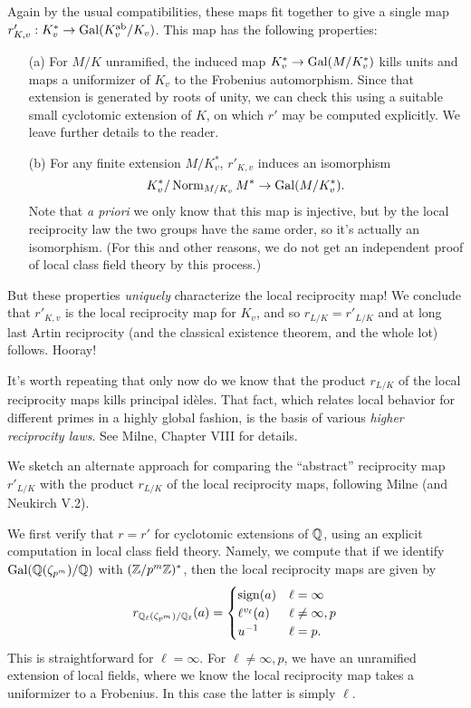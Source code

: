 Again by the usual compatibilities,
these maps fit together to give a single map
$r'_{K,v}: K_v^* \to \operatorname{Gal}(K_v^{\operatorname{ab}}/K_v)$. This map has the following
properties:
\begin{enumerate}
\item[(a)]
For $M/K$ unramified,
the induced map $K_v^* \to \operatorname{Gal}(M/K_v^*)$ kills units
and maps a uniformizer of $K_v$ to the Frobenius automorphism. Since that
extension is generated by roots of unity, we can check this using a 
suitable small cyclotomic extension of $K$, on which $r'$ may be computed explicitly.
We leave further details to the reader.

\item[(b)]
For any finite extension $M/K_v^*$, $r'_{K,v}$ induces an isomorphism
\[
K_v^*/\operatorname{Norm}_{M/K_v} M^* \to \operatorname{Gal}(M/K_v^*).
\]
Note that \emph{a priori} we only know that this map is injective, but by the local reciprocity law the
two groups have the same order, so it's actually an isomorphism. (For this and other reasons, we do not get an independent proof of
local class field theory by this process.)
\end{enumerate}
But these properties \emph{uniquely} characterize the local reciprocity map!
We conclude that $r'_{K,v}$ is the local reciprocity map for $K_v$,
and so $r_{L/K} = r'_{L/K}$ and at long last Artin reciprocity (and the
classical existence theorem, and the whole lot) follows.
Hooray!

It's worth repeating that only now do we know that the product
$r_{L/K}$ of the local reciprocity maps kills principal id\`eles. That fact,
which relates local behavior for different primes in a highly global
fashion, is the basis of various \emph{higher reciprocity laws}. See Milne,
Chapter VIII for details.


We sketch an alternate approach for comparing the ``abstract'' reciprocity
map $r'_{L/K}$ with the product $r_{L/K}$ of the local reciprocity maps,
following Milne (and Neukirch V.2).

We first verify that $r = r'$ for cyclotomic extensions of $\mathbb{Q}$,
using an explicit computation in local class field theory. Namely,
we compute that if we identify $\operatorname{Gal}(\mathbb{Q}(\zeta_{p^m})/\mathbb{Q})$ with 
$(\mathbb{Z}/p^m\mathbb{Z})^*$, then
the local reciprocity maps are given by
\[
r_{\mathbb{Q}_{\ell}(\zeta_{p^m})/\mathbb{Q}_{\ell}}(a)
= \begin{cases} \operatorname{sign}(a) & \ell = \infty \\
\ell^{v_{\ell}}(a) & \ell \neq \infty, p \\
u^{-1} & \ell = p.
\end{cases}
\]
This is straightforward for $\ell = \infty$. For $\ell \neq \infty, p$,
we have an unramified extension of local fields, where we know the 
local reciprocity map takes a uniformizer to a Frobenius. In this case
the latter is simply $\ell$.

